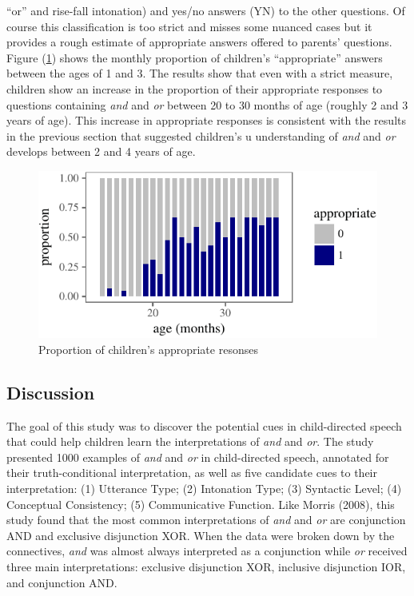 \documentclass[oneside]{report}
\theoremstyle{definition}
\theoremstyle{definition}
\theoremstyle{definition}
\theoremstyle{remark}
\begin{document}
``or'' and rise-fall intonation) and yes/no answers (YN) to the other
questions. Of course this classification is too strict and misses some
nuanced cases but it provides a rough estimate of appropriate answers
offered to parents' questions. Figure (\ref{fig:answerHitsPlot}) shows
the monthly proportion of children's ``appropriate'' answers between the
ages of 1 and 3. The results show that even with a strict measure,
children show an increase in the proportion of their appropriate
responses to questions containing \emph{and} and \emph{or} between 20 to
30 months of age (roughly 2 and 3 years of age). This increase in
appropriate responses is consistent with the results in the previous
section that suggested children's u understanding of \emph{and} and
\emph{or} develops between 2 and 4 years of age.
\begin{figure}[tb]

{\centering \includegraphics{figs/answerHitsPlot-1} 

}

\caption{Proportion of children's appropriate resonses}\label{fig:answerHitsPlot}
\end{figure}
\subsection{Discussion}\label{discussion-4}

The goal of this study was to discover the potential cues in
child-directed speech that could help children learn the interpretations
of \emph{and} and \emph{or}. The study presented 1000 examples of
\emph{and} and \emph{or} in child-directed speech, annotated for their
truth-conditional interpretation, as well as five candidate cues to
their interpretation: (1) Utterance Type; (2) Intonation Type; (3)
Syntactic Level; (4) Conceptual Consistency; (5) Communicative Function.
Like Morris (2008), this study found that the most common
interpretations of \emph{and} and \emph{or} are conjunction AND and
exclusive disjunction XOR. When the data were broken down by the
connectives, \emph{and} was almost always interpreted as a conjunction
while \emph{or} received three main interpretations: exclusive
disjunction XOR, inclusive disjunction IOR, and conjunction AND.
\end{document}
